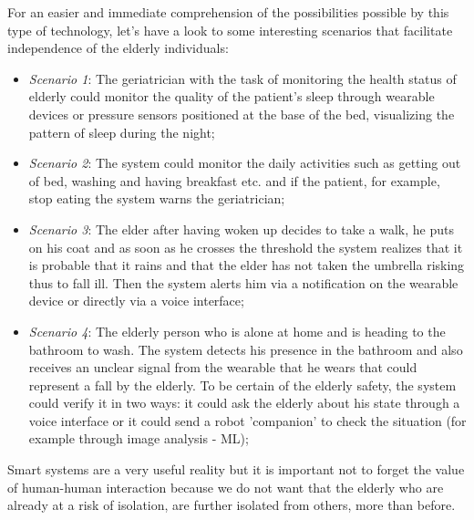 \documentclass{thesisreport}
\begin{document}
 For an easier and immediate comprehension of the possibilities possible by this type of technology, let's have a look to some interesting scenarios that facilitate independence of the elderly individuals:
 \begin{itemize}
     \item \textit{Scenario 1}: The geriatrician with the task of monitoring the health status of elderly could monitor the quality of the patient's sleep through wearable devices or pressure sensors positioned at the base of the bed, visualizing the pattern of sleep during the night;
     \item \textit{Scenario 2}: The system could monitor the daily activities such as getting out of bed, washing and having breakfast etc. and if the patient, for example, stop eating the system warns the geriatrician;
     \item \textit{Scenario 3}: The elder after having woken up decides to take a walk, he puts on his coat and as soon as he crosses the threshold the system realizes that it is probable that it rains and that the elder has not taken the umbrella risking thus to fall ill. Then the system alerts him via a notification on the wearable device or directly via a voice interface;
     \item \textit{Scenario 4}: The elderly person who is alone at home  and is heading to the bathroom to wash. The system detects his presence in the bathroom and also receives an unclear signal from the wearable that he wears that could represent a fall by the elderly. To be certain of the elderly safety, the system could verify it  in two ways: it could ask the elderly about his state through a voice interface or it could send a robot 'companion' to check the situation (for example through image analysis - ML);
 \end{itemize}
 
 Smart systems are a very useful reality but it is important not to forget the value of human-human interaction because we do not want that the elderly who are already at a risk of isolation, are further isolated from others, more than before.
 
\end{document}
